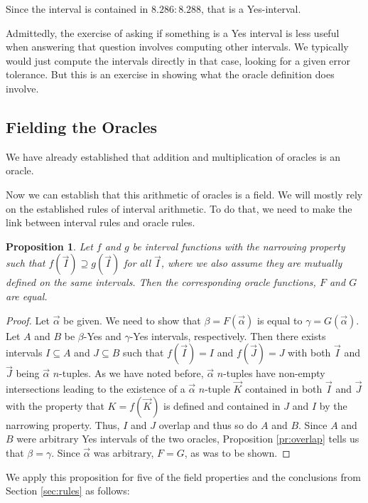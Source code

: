 \documentclass[12pt]{article}
\newtheorem{proposition}{Proposition}
\theoremstyle{remark}
\begin{document}
Since the interval is contained in $8.286:8.288$, that is a Yes-interval. 

Admittedly, the exercise of asking if something is a Yes interval is less useful when answering that question involves computing other intervals. We typically would just compute the intervals directly in that case, looking for a given error tolerance. But this is an exercise in showing what the oracle definition does involve.


\subsection{Fielding the Oracles}

We have already established that addition and multiplication of oracles is an oracle. 


Now we can establish that this arithmetic of oracles is a field. We will mostly rely on the established rules of interval arithmetic. To do that, we need to make the link between interval rules and oracle rules. 


\begin{proposition}
Let $f$ and $g$ be interval functions with the narrowing property such that $f(\vec{I}) \supseteq g(\vec{I})$ for all $\vec{I}$, where we also assume they are mutually defined on the same intervals. Then the corresponding oracle functions, $F$ and $G$ are equal.  
\end{proposition}

\begin{proof}
Let $\vec{\alpha}$ be given. We need to show that $\beta = F(\vec{\alpha})$ is equal to $\gamma =  G(\vec{\alpha})$. Let $A$ and $B$ be $\beta$-Yes and $\gamma$-Yes intervals, respectively. Then there exists intervals $I \subseteq A$ and  $J \subseteq B$  such that $f(\vec{I}) = I$ and $f(\vec{J}) = J$ with both  $\vec{I}$ and $\vec{J}$ being $\vec{\alpha}$ $n$-tuples. As we have noted before, $\vec{\alpha}$ $n$-tuples have non-empty intersections leading to the existence of a $\vec{\alpha}$ $n$-tuple $\vec{K}$ contained in both $\vec{I}$ and $\vec{J}$ with the property that $K = f(\vec{K})$ is defined and contained in $J$ and $I$ by the narrowing property. Thus, $I$ and $J$ overlap and thus so do $A$ and $B$. Since $A$ and $B$ were arbitrary Yes intervals of the two oracles, Proposition \ref{pr:overlap} tells us that $\beta = \gamma$. Since $\vec{\alpha}$ was arbitrary, $F = G$, as was to be shown.
\end{proof}

We apply this proposition for five of the field properties and the conclusions from Section \ref{sec:rules} as follows: 
\end{document}
